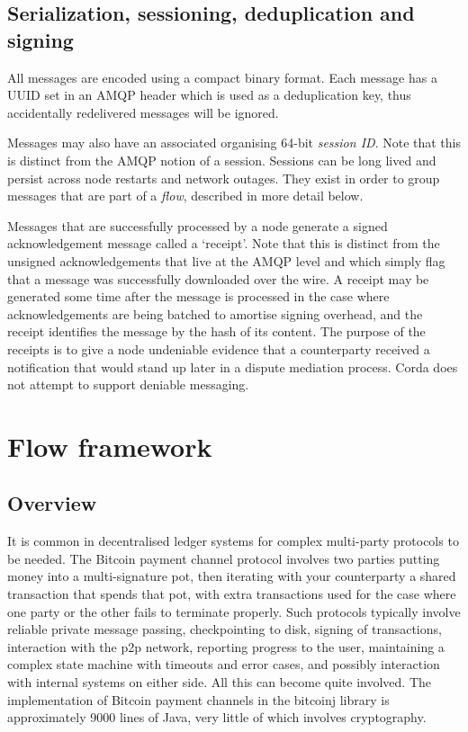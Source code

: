 \documentclass{article}
\begin{document}
\subsection{Serialization, sessioning, deduplication and signing}

All messages are encoded using a compact binary format. Each message has a UUID set in an AMQP header which is used
as a deduplication key, thus accidentally redelivered messages will be ignored.


Messages may also have an associated organising 64-bit \emph{session ID}. Note that this is distinct from the AMQP
notion of a session. Sessions can be long lived and persist across node restarts and network outages. They exist in order
to group messages that are part of a \emph{flow}, described in more detail below.

Messages that are successfully processed by a node generate a signed acknowledgement message called a `receipt'. Note that
this is distinct from the unsigned acknowledgements that live at the AMQP level and which simply flag that a message was
successfully downloaded over the wire. A receipt may be generated some time after the message is processed in the case
where acknowledgements are being batched to amortise signing overhead, and the receipt identifies the message by the hash
of its content. The purpose of the receipts is to give a node undeniable evidence that a counterparty received a
notification that would stand up later in a dispute mediation process. Corda does not attempt to support deniable
messaging.

\section{Flow framework}\label{sec:flows}

\subsection{Overview}

It is common in decentralised ledger systems for complex multi-party protocols to be needed. The Bitcoin payment channel
protocol\cite{PaymentChannels} involves two parties putting money into a multi-signature pot, then iterating with your
counterparty a shared transaction that spends that pot, with extra transactions used for the case where one party or the
other fails to terminate properly. Such protocols typically involve reliable private message passing, checkpointing to
disk, signing of transactions, interaction with the p2p network, reporting progress to the user, maintaining a complex
state machine with timeouts and error cases, and possibly interaction with internal systems on either side. All
this can become quite involved. The implementation of Bitcoin payment channels in the bitcoinj library is approximately
9000 lines of Java, very little of which involves cryptography.
\end{document}
